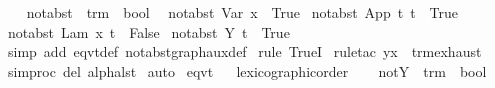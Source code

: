 \begin{isabellebody}
%
\isadelimproof
%
\endisadelimproof
%
\isamarkuptrue%
\isamarkupfalse%
\ \isanewline
\ \ not{\isacharunderscore}abst\ {\isacharcolon}{\isacharcolon}\ {\isachardoublequoteopen}trm\ {\isasymRightarrow}\ bool{\isachardoublequoteclose}\isanewline
{}\isanewline
\ \ {\isachardoublequoteopen}not{\isacharunderscore}abst\ {\isacharparenleft}Var\ x{\isacharparenright}\ {\isacharequal}\ True{\isachardoublequoteclose}\isanewline
{\isacharbar}\ {\isachardoublequoteopen}not{\isacharunderscore}abst\ {\isacharparenleft}App\ t{}\ t{}{\isacharparenright}\ {\isacharequal}\ True{\isachardoublequoteclose}\isanewline
{\isacharbar}\ {\isachardoublequoteopen}not{\isacharunderscore}abst\ {\isacharparenleft}Lam\ {\isacharbrackleft}x{\isacharbrackright}{\isachardot}\ t{\isacharparenright}\ {\isacharequal}\ False{\isachardoublequoteclose}\isanewline
{\isacharbar}\ {\isachardoublequoteopen}not{\isacharunderscore}abst\ {\isacharparenleft}Y\ t{\isacharparenright}\ {\isacharequal}\ True{\isachardoublequoteclose}\isanewline
%
\isadelimproof
%
\endisadelimproof
%
\isatagproof
{}\isamarkupfalse%
\ {\isacharparenleft}simp\ add{\isacharcolon}\ eqvt{\isacharunderscore}def\ not{\isacharunderscore}abst{\isacharunderscore}graph{\isacharunderscore}aux{\isacharunderscore}def{\isacharparenright}\isanewline
{}\isamarkupfalse%
\ {\isacharparenleft}rule\ TrueI{\isacharparenright}\isanewline
{}\isamarkupfalse%
\ {\isacharparenleft}rule{\isacharunderscore}tac\ y{\isacharequal}{\isachardoublequoteopen}x{\isachardoublequoteclose}\ \ trm{\isachardot}exhaust{\isacharparenright}\isanewline
{}\isamarkupfalse%
\ {\isacharbrackleft}{\isacharbrackleft}simproc\ del{\isacharcolon}\ alpha{\isacharunderscore}lst{\isacharbrackright}{\isacharbrackright}\isanewline
{}\isamarkupfalse%
\ auto%
\endisatagproof
{\isafoldproof}%
%
\isadelimproof
\isanewline
%
\endisadelimproof
{}\isamarkupfalse%
\ {\isacharparenleft}eqvt{\isacharparenright}%
\isadelimproof
\ %
\endisadelimproof
%
\isatagproof
{}\isamarkupfalse%
\ lexicographic{\isacharunderscore}order%
\endisatagproof
{\isafoldproof}%
%
\isadelimproof
%
\endisadelimproof
\isanewline
\isanewline
{}\isamarkupfalse%
\ \isanewline
\ \ not{\isacharunderscore}Y\ {\isacharcolon}{\isacharcolon}\ {\isachardoublequoteopen}trm\ {\isasymRightarrow}\ bool{\isachardoublequoteclose}\isanewline

\end{isabellebody}

